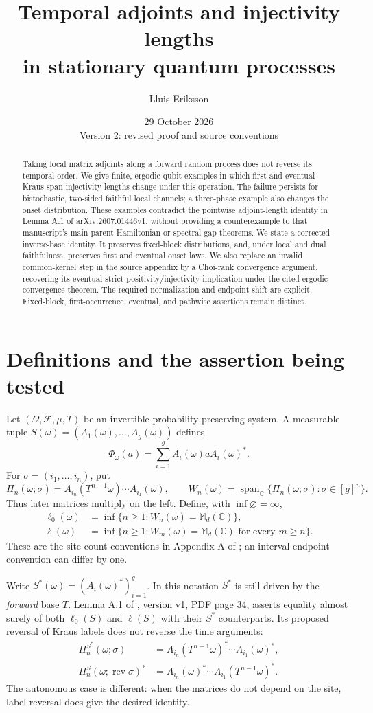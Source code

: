 \documentclass[11pt,a4paper]{article}
\title{Temporal adjoints and injectivity lengths\\in stationary quantum processes}
\author{Lluis Eriksson}
\date{29 October 2026\\Version 2: revised proof and source conventions}
\newcommand{\M}{\mathbb M_d(\mathbb C)}
\newcommand{\Span}{\operatorname{span}}
\begin{document}
\maketitle
\begin{abstract}
Taking local matrix adjoints along a forward random process does not reverse its temporal order. We give finite, ergodic qubit examples in which first and eventual Kraus-span injectivity lengths change under this operation. The failure persists for bistochastic, two-sided faithful local channels; a three-phase example also changes the onset distribution. These examples contradict the pointwise adjoint-length identity in Lemma A.1 of arXiv:2607.01446v1, without providing a counterexample to that manuscript's main parent-Hamiltonian or spectral-gap theorems. We state a corrected inverse-base identity. It preserves fixed-block distributions, and, under local and dual faithfulness, preserves first and eventual onset laws. We also replace an invalid common-kernel step in the source appendix by a Choi-rank convergence argument, recovering its eventual-strict-positivity/injectivity implication under the cited ergodic convergence theorem. The required normalization and endpoint shift are explicit. Fixed-block, first-occurrence, eventual, and pathwise assertions remain distinct.
\end{abstract}

\section{Definitions and the assertion being tested}
Let $(\Omega,\mathcal F,\mu,T)$ be an invertible probability-preserving system. A measurable tuple
$S(\omega)=(A_1(\omega),\ldots,A_g(\omega))$ defines
\[
 \Phi_\omega(a)=\sum_{i=1}^g A_i(\omega)aA_i(\omega)^*.
\]
For $\sigma=(i_1,\ldots,i_n)$, put
\[
 \Pi_n(\omega;\sigma)=A_{i_n}(T^{n-1}\omega)\cdots A_{i_1}(\omega),
 \qquad W_n(\omega)=\Span_{\mathbb C}\{\Pi_n(\omega;\sigma):\sigma\in[g]^n\}.
\]
Thus later matrices multiply on the left. Define, with $\inf\varnothing=\infty$,
\begin{align*}
 \ell_0(\omega)&=\inf\{n\geq1:W_n(\omega)=\M\},\\
 \ell(\omega)&=\inf\{n\geq1:W_m(\omega)=\M\text{ for every }m\geq n\}.
\end{align*}
These are the site-count conventions in Appendix A of \cite{EMPS}; an interval-endpoint convention can differ by one.

Write $S^*(\omega)=(A_i(\omega)^*)_{i=1}^g$. In this notation $S^*$ is still driven by the \emph{forward} base $T$. Lemma A.1 of \cite{EMPS}, version v1, PDF page 34, asserts equality almost surely of both $\ell_0(S)$ and $\ell(S)$ with their $S^*$ counterparts. Its proposed reversal of Kraus labels does not reverse the time arguments:
\begin{align*}
 \Pi_n^{S^*}(\omega;\sigma)
 &=A_{i_n}(T^{n-1}\omega)^*\cdots A_{i_1}(\omega)^*,\\
 \Pi_n^S(\omega;\operatorname{rev}\sigma)^*
 &=A_{i_n}(\omega)^*\cdots A_{i_1}(T^{n-1}\omega)^*.
\end{align*}
The autonomous case is different: when the matrices do not depend on the site, label reversal does give the desired identity.
\end{document}
